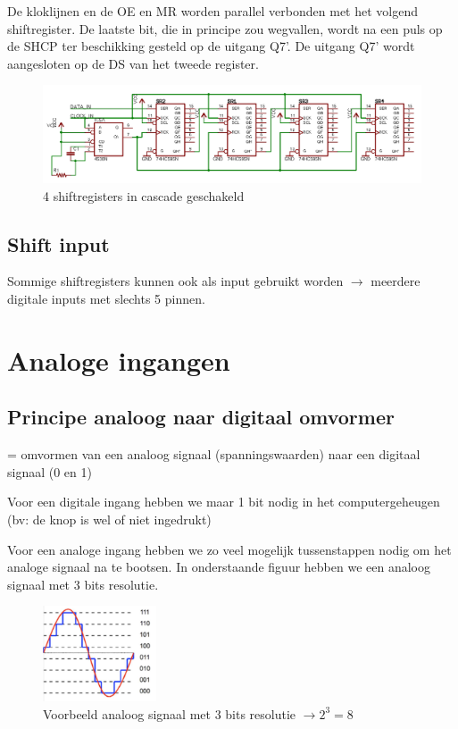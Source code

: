 \documentclass{article}
\begin{document}
De kloklijnen en de OE en MR worden parallel verbonden met het volgend shiftregister. 
De laatste bit, die in principe zou wegvallen, wordt na een puls op de SHCP ter beschikking gesteld op de uitgang Q7’. 
De uitgang Q7’ wordt aangesloten op de DS van het tweede register.

\begin{figure}[H]
    \centering
    \includegraphics[width=\textwidth]{shiftregister-4cascade.png}
    \caption{4 shiftregisters in cascade geschakeld}
\end{figure}


\subsection{Shift input}
Sommige shiftregisters kunnen ook als input gebruikt worden $\rightarrow$ meerdere digitale inputs met slechts 5 pinnen.


\section{Analoge ingangen}

\subsection{Principe analoog naar digitaal omvormer}
= omvormen van een analoog signaal (spanningswaarden) naar een digitaal signaal (0 en 1)

Voor een digitale ingang hebben we maar 1 bit nodig in het computergeheugen (bv: de knop is wel of niet ingedrukt)

Voor een analoge ingang hebben we zo veel mogelijk tussenstappen nodig om het analoge signaal na te bootsen.
In onderstaande figuur hebben we een analoog signaal met 3 bits resolutie. 

\begin{figure}[H]
    \centering
    \includegraphics[width=0.3\textwidth]{analoge-ingangen.png}
    \caption{Voorbeeld analoog signaal met 3 bits resolutie $\rightarrow 2^3 = 8$}
\end{figure}
\end{document}
